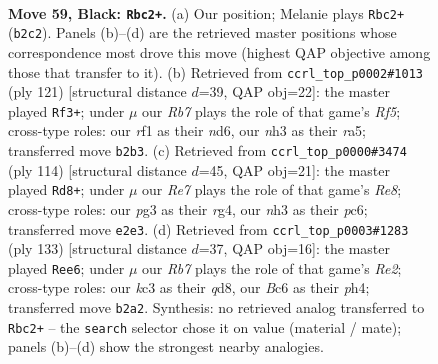 \documentclass[11pt]{article}
\begin{document}
\clearpage

\begin{figure}[p]\centering
\begin{subfigure}{0.46\textwidth}\centering
\resizebox{\linewidth}{!}{%
\newchessgame
\chessboard[
  setfen={8/6k1/1pb5/p1p5/8/2K3PN/1r2rp1P/5R2 b - - 1 59},
  showmover=false,
  pgfstyle=straightmove, color=movearrow, markmove={b2-c2}
]}
\caption{}
\end{subfigure}\hfill
\begin{subfigure}{0.46\textwidth}\centering
\resizebox{\linewidth}{!}{%
\newchessgame
\chessboard[
  setfen={5k2/5p2/3N2p1/R2n2P1/P3pr2/1P4K1/8/8 b - - 0 61},
  showmover=false,
  pgfstyle=straightmove, color=movearrow, markmove={f4-f3}
]}
\caption{}
\end{subfigure}
\\[4pt]
\begin{subfigure}{0.46\textwidth}\centering
\resizebox{\linewidth}{!}{%
\newchessgame
\chessboard[
  setfen={4R3/1p3r2/2p5/6p1/2PkP1r1/1P2R3/4K3/8 w - - 6 58},
  showmover=false,
  pgfstyle=straightmove, color=movearrow, markmove={e8-d8}
]}
\caption{}
\end{subfigure}\hfill
\begin{subfigure}{0.46\textwidth}\centering
\resizebox{\linewidth}{!}{%
\newchessgame
\chessboard[
  setfen={3Q4/1p2r1k1/p4r2/8/7P/P3p3/1PP1K3/8 b - - 15 67},
  showmover=false,
  pgfstyle=straightmove, color=movearrow, markmove={e7-e6}
]}
\caption{}
\end{subfigure}
\caption{\textbf{Move 59, Black: \texttt{Rbc2+}.} (a) Our position; Melanie plays \texttt{Rbc2+} (\texttt{b2c2}). Panels (b)--(d) are the retrieved master positions whose correspondence most drove this move (highest QAP objective among those that transfer to it). (b) Retrieved from \texttt{ccrl\_top\_p0002\#1013} (ply 121) [structural distance $d$=39, QAP obj=22]: the master played \texttt{Rf3+}; under $\mu$ our \emph{Rb7} plays the role of that game's \emph{Rf5}; cross-type roles: our \emph{r}f1 as their \emph{n}d6, our \emph{n}h3 as their \emph{r}a5; transferred move \texttt{b2b3}. (c) Retrieved from \texttt{ccrl\_top\_p0000\#3474} (ply 114) [structural distance $d$=45, QAP obj=21]: the master played \texttt{Rd8+}; under $\mu$ our \emph{Re7} plays the role of that game's \emph{Re8}; cross-type roles: our \emph{p}g3 as their \emph{r}g4, our \emph{n}h3 as their \emph{p}c6; transferred move \texttt{e2e3}. (d) Retrieved from \texttt{ccrl\_top\_p0003\#1283} (ply 133) [structural distance $d$=37, QAP obj=16]: the master played \texttt{Ree6}; under $\mu$ our \emph{Rb7} plays the role of that game's \emph{Re2}; cross-type roles: our \emph{k}c3 as their \emph{q}d8, our \emph{B}c6 as their \emph{p}h4; transferred move \texttt{b2a2}. Synthesis: no retrieved analog transferred to \texttt{Rbc2+} -- the \texttt{search} selector chose it on value (material / mate); panels (b)--(d) show the strongest nearby analogies.}
\label{fig:thought-m117}
\end{figure}
\end{document}
